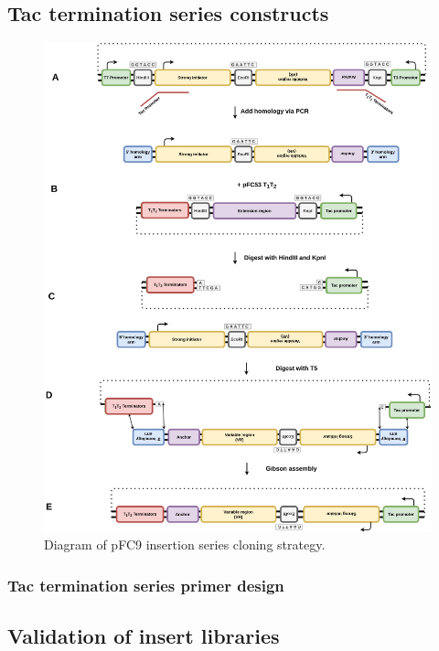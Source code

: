 \documentclass[11pt]{article}
\begin{document}
\subsection{Tac termination series constructs}
\label{sec:tac-termination}


\begin{figure}[H]
	\includegraphics[width=15cm]{images/cloning_diagrams/construct_diagrams-Tac-termination-series.png}
	\centering
	\caption{Diagram of pFC9 insertion series cloning strategy.}
\end{figure}

\subsubsection{Tac termination series primer design}

\subsection{Validation of insert libraries}
\end{document}

